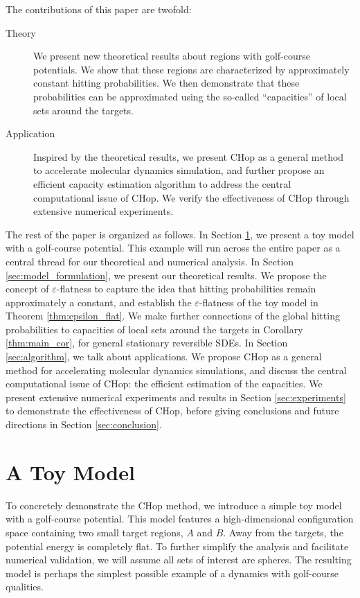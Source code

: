 \documentclass[english, aip, jcp, priprint, graphicx,floatfix]{revtex4-1}
\theoremstyle{plain}
\theoremstyle{definition}
\theoremstyle{plain}
\begin{document}
The contributions of this paper are twofold:

\begin{description}
	\item[Theory] We present new theoretical results about regions with golf-course potentials.  We show that these regions are characterized by approximately constant hitting probabilities.  We then demonstrate that these probabilities can be approximated using the so-called “capacities” of local sets around the targets.
	\item[Application] Inspired by the theoretical results, we present CHop as a general method to accelerate molecular dynamics simulation, and further propose an efficient capacity estimation algorithm to address the central computational issue of CHop.  We verify the effectiveness of CHop through extensive numerical experiments.
\end{description}

The rest of the paper is organized as follows. In Section \ref{sec:toy_model}, we present a toy model with a golf-course potential.  This example will run across the entire paper as a central thread for our theoretical and numerical analysis. In Section \ref{sec:model_formulation}, we present our theoretical results. We propose the concept of $\varepsilon$-flatness to capture the idea that hitting probabilities remain approximately a constant, and establish the $\varepsilon$-flatness of the toy model in Theorem \ref{thm:epsilon_flat}. We make further connections of the global hitting probabilities to capacities of local sets around the targets in Corollary \ref{thm:main_cor}, for general stationary reversible SDEs. In Section \ref{sec:algorithm}, we talk about applications. We propose CHop as a general method for accelerating molecular dynamics simulations, and discuss the central computational issue of CHop: the efficient estimation of the capacities. We present extensive numerical experiments and results in Section \ref{sec:experiments} to demonstrate the effectiveness of CHop, before giving conclusions and future directions in Section \ref{sec:conclusion}.

\section{A Toy Model}\label{sec:toy_model}

To concretely demonstrate the CHop method, we introduce a simple toy model with a golf-course potential.  This model features a high-dimensional configuration space containing two small target regions, $A$ and $B$.  Away from the targets, the potential energy is completely flat.  To further simplify the analysis and facilitate numerical validation, we will assume all sets of interest are spheres.  The resulting model is perhaps the simplest possible example of a dynamics with golf-course qualities.  
\end{document}
